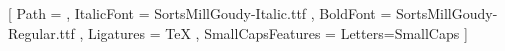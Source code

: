 \setmainfont{SortsMillGoudy-Regular.ttf}[
  Path = \fontdir , ItalicFont = SortsMillGoudy-Italic.ttf ,
  BoldFont = SortsMillGoudy-Regular.ttf , Ligatures = TeX ,
  SmallCapsFeatures = {Letters=SmallCaps} ]
\let\caps\realcaps
